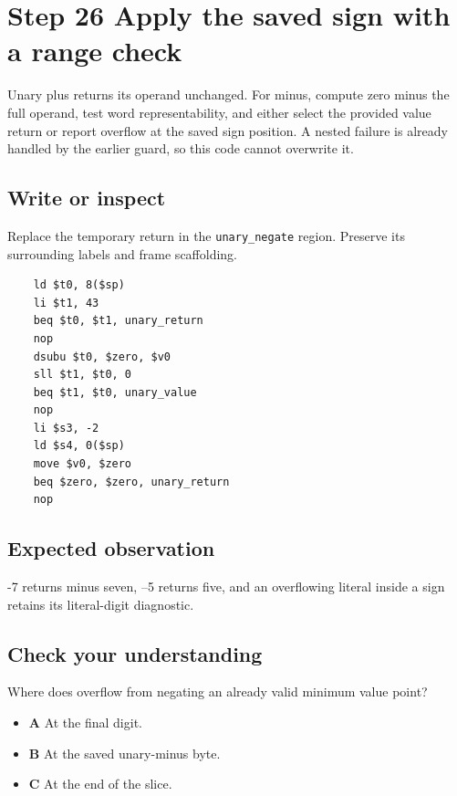 \section{Step 26 Apply the saved sign with a range check}\label{expression-s26}

Unary plus returns its operand unchanged. For minus, compute zero minus the full operand, test word representability, and either select the provided value return or report overflow at the saved sign position. A nested failure is already handled by the earlier guard, so this code cannot overwrite it.

\subsection{Write or inspect}
Replace the temporary return in the \texttt{unary\_negate} region. Preserve its surrounding labels and frame scaffolding.

\begin{verbatim}
    ld $t0, 8($sp)
    li $t1, 43
    beq $t0, $t1, unary_return
    nop
    dsubu $t0, $zero, $v0
    sll $t1, $t0, 0
    beq $t1, $t0, unary_value
    nop
    li $s3, -2
    ld $s4, 0($sp)
    move $v0, $zero
    beq $zero, $zero, unary_return
    nop
\end{verbatim}
\subsection{Expected observation}
-7 returns minus seven, --5 returns five, and an overflowing literal inside a sign retains its literal-digit diagnostic.

\subsection{Check your understanding}
Where does overflow from negating an already valid minimum value point?

\begin{itemize}
  \item \textbf{A} At the final digit.
  \item \textbf{B} At the saved unary-minus byte.
  \item \textbf{C} At the end of the slice.
\end{itemize}
